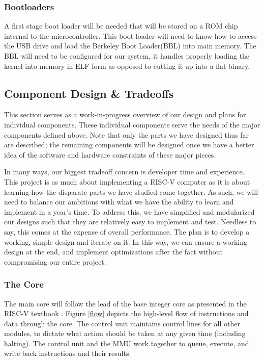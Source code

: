 \documentclass{article}
\begin{document}
    \subsubsection{Bootloaders}
    A first stage boot loader will be needed that will be stored on a ROM chip internal to the microcontroller. This boot loader will need to know how to access the USB drive and load the Berkeley Boot Loader(BBL) into main memory. The BBL will need to be configured for our system, it handles properly loading the kernel into memory in ELF form as opposed to cutting it up into a flat binary.

\subsection{Component Design \& Tradeoffs}
    This section serves as a work-in-progress overview of our design and plans for individual components.  These individual components serve the needs of the major components defined above.  Note that only the parts we have designed thus far are described; the remaining components will be designed once we have a better idea of the software and hardware constraints of these major pieces.
    
    In many ways, our biggest tradeoff concern is developer time and experience.  This project is as much about implementing a RISC-V computer as it is about learning how the disparate parts we have studied come together.  As such, we will need to balance our ambitions with what we have the ability to learn and implement in a year's time.  To address this, we have simplified and modularized our designs such that they are relatively easy to implement and test.  Needless to say, this comes at the expense of overall performance.  The plan is to develop a working, simple design and iterate on it.  In this way, we can ensure a working design at the end, and implement optimizations after the fact without compromising our entire project.
    
    \subsubsection{The Core}
    The main core will follow the lead of the base integer core as presented in the RISC-V textbook \cite{RISCV_TEXT}.  Figure \ref{flow} depicts the high-level flow of instructions and data through the core.  The control unit maintains control lines for all other modules, to dictate what action should be taken at any given time (including halting).  The control unit and the MMU work together to queue, execute, and write back instructions and their results.
    
\end{document}
